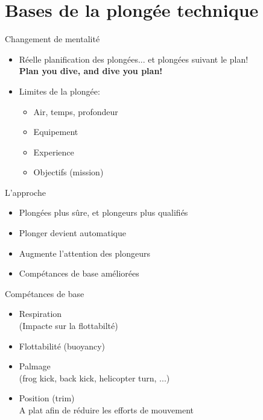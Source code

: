 
\section{Bases de la plongée technique}

\begin{frame}{Changement de mentalité}
	\begin{itemize}
		\item Réelle planification des plongées... et plongées suivant le plan!\\\textbf{Plan you dive, 	and dive you plan!}
		\item Limites de la plongée:
		\begin{itemize}
			\item Air, temps, profondeur
			\item Equipement
			\item Experience
			\item Objectifs (mission)
		\end{itemize} 
	\end{itemize}
\end{frame}

\begin{frame}{L'approche}  
	\begin{itemize}
		\item Plongées plus sûre, et plongeurs plus qualifiés
		\item Plonger devient automatique
		\item Augmente l'attention des plongeurs
		\item Compétances de base améliorées
	\end{itemize}
\end{frame}

\begin{frame}{Compétances de base}
	\begin{itemize}
		\item Respiration\\(Impacte sur la flottabilté)
		\item Flottabilité (buoyancy)
		\item Palmage\\(frog kick, back kick, helicopter turn, ...)
		\item Position (trim)\\ A plat afin de réduire les efforts de mouvement
	\end{itemize}
\end{frame}
